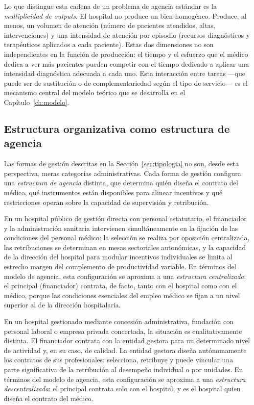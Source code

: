 Lo que distingue esta cadena de un problema de agencia estándar es la \textit{multiplicidad de outputs}. El hospital no produce un bien homogéneo. Produce, al menos, un volumen de atención (número de pacientes atendidos, altas, intervenciones) y una intensidad de atención por episodio (recursos diagnósticos y terapéuticos aplicados a cada paciente). Estas dos dimensiones no son independientes en la función de producción: el tiempo y el esfuerzo que el médico dedica a ver más pacientes pueden competir con el tiempo dedicado a aplicar una intensidad diagnóstica adecuada a cada uno. Esta interacción entre tareas ---que puede ser de sustitución o de complementariedad según el tipo de servicio--- es el mecanismo central del modelo teórico que se desarrolla en el Capítulo~\ref{ch:modelo}.

\subsection{Estructura organizativa como estructura de agencia}

Las formas de gestión descritas en la Sección~\ref{sec:tipologia} no son, desde esta perspectiva, meras categorías administrativas. Cada forma de gestión configura una \textit{estructura de agencia} distinta, que determina quién diseña el contrato del médico, qué instrumentos están disponibles para alinear incentivos y qué restricciones operan sobre la capacidad de supervisión y retribución.

En un hospital público de gestión directa con personal estatutario, el financiador y la administración sanitaria intervienen simultáneamente en la fijación de las condiciones del personal médico: la selección se realiza por oposición centralizada, las retribuciones se determinan en mesas sectoriales autonómicas, y la capacidad de la dirección del hospital para modular incentivos individuales se limita al estrecho margen del complemento de productividad variable. En términos del modelo de agencia, esta configuración se aproxima a una \textit{estructura centralizada}: el principal (financiador) contrata, de facto, tanto con el hospital como con el médico, porque las condiciones esenciales del empleo médico se fijan a un nivel superior al de la dirección hospitalaria.

En un hospital gestionado mediante concesión administrativa, fundación con personal laboral o empresa privada concertada, la situación es cualitativamente distinta. El financiador contrata con la entidad gestora para un determinado nivel de actividad y, en su caso, de calidad. La entidad gestora diseña autónomamente los contratos de sus profesionales: selecciona, retribuye y puede vincular una parte significativa de la retribución al desempeño individual o por unidades. En términos del modelo de agencia, esta configuración se aproxima a una \textit{estructura descentralizada}: el principal contrata solo con el hospital, y es el hospital quien diseña el contrato del médico.

